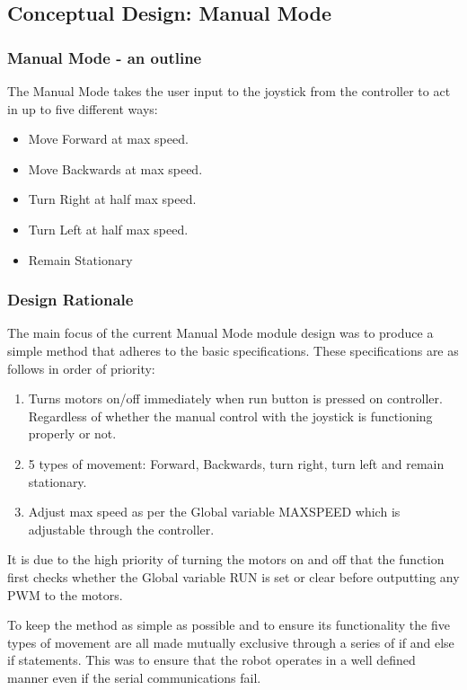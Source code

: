 \documentclass[MTRX3700report.tex]{subfiles}
\begin{document}
	\subsection{Conceptual Design: Manual Mode}
	
	\subsubsection{Manual Mode - an outline}
	The Manual Mode takes the user input to the joystick from the controller to act in up to five different ways:
	
	\begin{itemize}
		\item Move Forward at max speed.
		\item Move Backwards at max speed.
		\item Turn Right at half max speed.
		\item Turn Left at half max speed.
		\item Remain Stationary
	\end{itemize} 
	
	
	\subsubsection{Design Rationale}
	The main focus of the current Manual Mode module design was to produce a simple method that adheres to the basic specifications. These specifications are as follows in order of priority:
	
	\begin{enumerate}
		\item Turns motors on/off immediately when run button is pressed on controller. Regardless of whether the manual control with the joystick is functioning properly or not.
		\item 5 types of movement: Forward, Backwards, turn right, turn left and remain stationary.
		\item Adjust max speed as per the Global variable MAX\textunderscore SPEED which is adjustable through the controller.  	
	\end{enumerate} 
	
	It is due to the high priority of turning the motors on and off that the function first checks whether the Global variable RUN is set or clear before outputting any PWM to the motors.
	
	To keep the method as simple as possible and to ensure its functionality the five types of movement are all made mutually exclusive through a series of if and else if statements. This was to ensure that the robot operates in a well defined manner even if the serial communications fail. 
	
\end{document}
